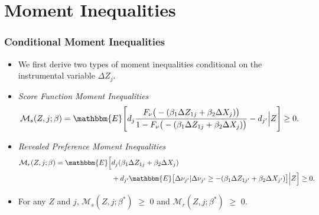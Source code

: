 
\section{Moment Inequalities}


\begin{frame}
\frametitle{Conditional Moment Inequalities}

\begin{itemize}
\item We first derive two types of moment inequalities conditional on the
instrumental variable $\Delta Z_{j}$. 

\item \textit{Score Function Moment Inequalities}  
\begin{align*}
\mathcal{M}_{s}(Z,j;\beta)=\mathbbm{E}\Bigg[d_{j}\frac{F_{\nu}\big(%
-(\beta_{1}\Delta Z_{1j}+\beta_{2}\Delta X_{j})\big)}{1-F_{\nu}\big(%
-(\beta_{1}\Delta Z_{1j}+\beta_{2}\Delta X_{j})\big)}-d_{j^{\prime }}\Big|Z%
\Bigg]\geq 0.
\end{align*}

\item \textit{Revealed Preference Moment Inequalities}  
\begin{align*}
\mathcal{M}_{r}(Z,j;\beta)=\mathbbm{E}\Big[&d_{j}(\beta_{1}\Delta
Z_{1j}+\beta_{2}\Delta X_{j})  \notag \\
&+d_{j^{\prime }}\mathbbm{E}\big[\Delta\nu_{j^{\prime
}}|\Delta\nu_{j^{\prime }}\geq-(\beta_{1}\Delta Z_{1j^{\prime
}}+\beta_{2}\Delta X_{j^{\prime }})\big]\Big|Z\Big]\geq 0.
\end{align*}

\item For any $Z$ and $j$, $\mathcal{M}_{s}(Z,j;\beta^{*})$ $\geq$ $0$ and $%
\mathcal{M}_{r}(Z,j;\beta^{*})$ $\geq$ $0$.
\end{itemize}
\end{frame}


